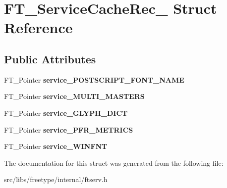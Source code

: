 \hypertarget{struct_f_t___service_cache_rec__}{
\section{FT\_\-ServiceCacheRec\_\- Struct Reference}
\label{struct_f_t___service_cache_rec__}
}
\subsection*{Public Attributes}
\begin{DoxyCompactItemize}
\item 
\hypertarget{struct_f_t___service_cache_rec___a1b95ee574621c8b031fe239d449bfa5c}{
FT\_\-Pointer {\bfseries service\_\-POSTSCRIPT\_\-FONT\_\-NAME}}
\label{struct_f_t___service_cache_rec___a1b95ee574621c8b031fe239d449bfa5c}

\item 
\hypertarget{struct_f_t___service_cache_rec___abf51ac75b59eeac29ad5e4bbbc50e749}{
FT\_\-Pointer {\bfseries service\_\-MULTI\_\-MASTERS}}
\label{struct_f_t___service_cache_rec___abf51ac75b59eeac29ad5e4bbbc50e749}

\item 
\hypertarget{struct_f_t___service_cache_rec___af8bbf442f497ad21666069ec33aaa88a}{
FT\_\-Pointer {\bfseries service\_\-GLYPH\_\-DICT}}
\label{struct_f_t___service_cache_rec___af8bbf442f497ad21666069ec33aaa88a}

\item 
\hypertarget{struct_f_t___service_cache_rec___ac5d029d7f442e8b727c40d5a88faa344}{
FT\_\-Pointer {\bfseries service\_\-PFR\_\-METRICS}}
\label{struct_f_t___service_cache_rec___ac5d029d7f442e8b727c40d5a88faa344}

\item 
\hypertarget{struct_f_t___service_cache_rec___abb824452cfb20932fbd22405323781f9}{
FT\_\-Pointer {\bfseries service\_\-WINFNT}}
\label{struct_f_t___service_cache_rec___abb824452cfb20932fbd22405323781f9}

\end{DoxyCompactItemize}


The documentation for this struct was generated from the following file:\begin{DoxyCompactItemize}
\item 
src/libs/freetype/internal/ftserv.h\end{DoxyCompactItemize}
